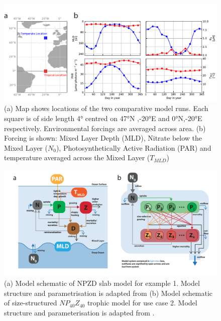 \documentclass[journal abbreviation, manuscript]{copernicus}
\begin{document}
\begin{figure}[t]
\includegraphics[width=15cm]{Figures/firstdraft_plots/01_forcing_labeled.pdf}
\caption{(a) Map shows locations of the two comparative model runs. Each square is of side length 4° centred on 47°N ,-20°E and 0°N,-20°E respectively. Environmental forcings are averaged across area. (b) Forcing is shown: Mixed Layer Depth (MLD), Nitrate below the Mixed Layer ($N_0$), Photosynthetically Active Radiation (PAR) and temperature averaged across the Mixed Layer ($T_{MLD}$)}
\label{phydraforcing}
\end{figure}

\begin{figure}[t]
\includegraphics[width=15cm]{Figures/firstdraft_schematics/02__schematics_NPZDandChemostat.pdf}
\caption{(a) Model schematic of NPZD slab model for example 1. Model structure and parametrisation is adapted
from \citet{Anderson2015c} (b) Model schematic of size-structured $NP_{40}Z_{40}$ trophic model for use case 2. Model structure and parameterisation is adapted from \citet{Banas2011b}.}
\label{phydraschematics_1}
\end{figure}
\end{document}
